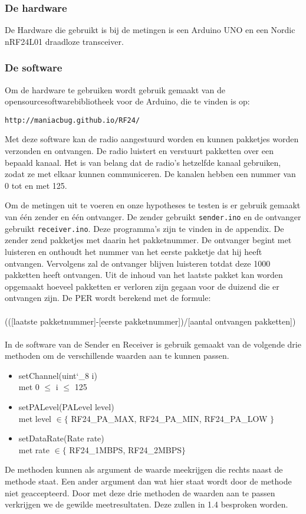 \documentclass{article}
\begin{document}
\subsubsection{De hardware}
De Hardware die gebruikt is bij de metingen is een Arduino UNO en een Nordic nRF24L01 draadloze transceiver.\\

\subsubsection{De software}
Om de hardware te gebruiken wordt gebruik gemaakt van de opensourcesoftwarebibliotheek voor de Arduino, die te vinden is op: \begin{verbatim}http://maniacbug.github.io/RF24/ \end{verbatim} 

Met deze software kan de radio aangestuurd worden en kunnen pakketjes worden verzonden en ontvangen. De radio luistert en verstuurt pakketten over een bepaald kanaal. Het is van belang dat de radio's hetzelfde kanaal gebruiken, zodat ze met elkaar kunnen communiceren. De kanalen hebben een nummer van 0 tot en met 125. 

Om de metingen uit te voeren en onze hypotheses te testen is er gebruik gemaakt van \'{e}\'{e}n zender en \'{e}\'{e}n ontvanger. De zender gebruikt \texttt{sender.ino} en de ontvanger gebruikt \texttt{receiver.ino}. Deze programma's zijn te vinden in de appendix. De zender zend pakketjes met daarin het pakketnummer. De ontvanger begint met luisteren en onthoudt het nummer van het eerste pakketje dat hij heeft ontvangen. Vervolgens zal de ontvanger blijven luisteren totdat deze 1000 pakketten heeft ontvangen. Uit de inhoud van het laatste pakket kan worden opgemaakt hoeveel pakketten er verloren zijn gegaan voor de duizend die er ontvangen zijn. De PER wordt berekend met de formule:\\
\\
\indent	(([laatste pakketnummer]-[eerste pakketnummer])/[aantal ontvangen pakketten])\\
\\
In de software van de Sender en Receiver is gebruik gemaakt van de volgende drie methoden om de verschillende waarden aan te kunnen passen. 
\begin{itemize}
	\item setChannel(uint\char`_8 i) \\
	met 0 $\leq$ i $\leq$ 125
	\item setPALevel(PALevel level) \\
	met level $\in \{$  RF24\_PA\_MAX, RF24\_PA\_MIN, RF24\_PA\_LOW $\}$
	\item setDataRate(Rate rate) \\
	met rate $\in \{$ RF24\_1MBPS, RF24\_2MBPS$\}$
\end{itemize}
De methoden kunnen als argument de waarde meekrijgen die rechts naast de methode staat. Een ander argument dan wat hier staat wordt door de methode niet geaccepteerd. 
Door met deze drie methoden de waarden aan te passen verkrijgen we de gewilde meetresultaten. Deze zullen in 1.4 besproken worden.\\
\end{document}
